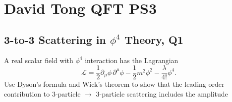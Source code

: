 
\section{David Tong QFT PS3}
\subsection{3-to-3 Scattering in \texorpdfstring{$\phi^4$}{phi4} Theory, Q1}
A real scalar field with $\phi^4$ interaction has the Lagrangian
\begin{equation}
    \mathcal{L} = \frac{1}{2}\partial_\mu\phi\,\partial^\mu\phi - \frac{1}{2}m^2\phi^2 - \frac{\lambda}{4!}\phi^4.
\end{equation}
Use Dyson's formula and Wick's theorem to show that the leading order contribution to 3-particle $\to$ 3-particle scattering includes the amplitude
\usetikzlibrary{decorations.markings, arrows.meta}

